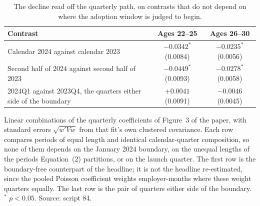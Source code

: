 \begin{table}[ht!]
\centering
\caption{The decline read off the quarterly path, on contrasts that do not depend on where the adoption window is judged to begin.}
\label{tab:fixed_contrasts}
\footnotesize
\begin{tabular}{lcc}
\toprule
Contrast & Ages 22--25 & Ages 26--30 \\
\midrule
Calendar 2024 against calendar 2023 & $-0.0342^{*}$ (0.0084) & $-0.0235^{*}$ (0.0056) \\
Second half of 2024 against second half of 2023 & $-0.0449^{*}$ (0.0093) & $-0.0278^{*}$ (0.0058) \\
2024Q1 against 2023Q4, the quarters either side of the boundary & $+0.0041$ (0.0091) & $-0.0046$ (0.0045) \\
\bottomrule
\end{tabular}
\begin{minipage}{0.94\textwidth}\footnotesize\vspace{4pt}Linear combinations of the quarterly coefficients of Figure~3 of the paper, with standard errors $\sqrt{w'Vw}$ from that fit's own clustered covariance. Each row compares periods of equal length and identical calendar-quarter composition, so none of them depends on the January 2024 boundary, on the unequal lengths of the periods Equation~(2) partitions, or on the launch quarter. The first row is the boundary-free counterpart of the headline; it is not the headline re-estimated, since the pooled Poisson coefficient weights employer-months where these weight quarters equally. The last row is the pair of quarters either side of the boundary. $^{*}$ $p<0.05$. Source: script 84.
\end{minipage}
\end{table}

